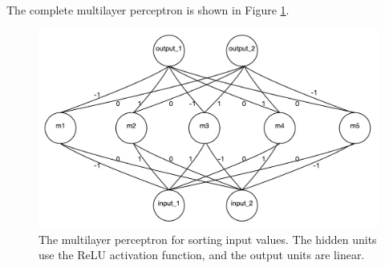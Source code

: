 \documentclass{myhw}
\begin{document}
\begin{homeworkProblem}
\\
\\
The complete multilayer perceptron is shown in Figure \ref{fig:q1.2}.
\begin{figure}[h]
  \centering
  \includegraphics[width=.5\textwidth]{q1.3.png} 
  \caption{The multilayer perceptron for sorting input values. The hidden units use the ReLU activation function, and the output units are linear. }
  \label{fig:q1.2}
\end{figure}
\end{homeworkProblem}
\end{document}
